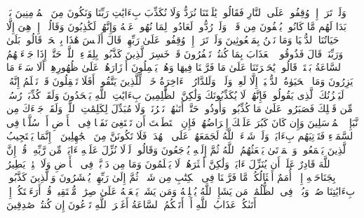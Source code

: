 \stopbuffer%
\startbuffer[\q:6:27]
وَلَوۡ تَرَىٰۤ إِذۡ وُقِفُوا۟ عَلَى ٱلنَّارِ فَقَالُوا۟ یَٰلَیۡتَنَا نُرَدُّ وَلَا نُكَذِّبَ بِءَایَٰتِ رَبِّنَا وَنَكُونَ مِنَ ٱلۡمُؤۡمِنِینَ%
\stopbuffer%
\startbuffer[\q:6:28]
بَلۡ بَدَا لَهُم مَّا كَانُوا۟ یُخۡفُونَ مِن قَبۡلُۖ وَلَوۡ رُدُّوا۟ لَعَادُوا۟ لِمَا نُهُوا۟ عَنۡهُ وَإِنَّهُمۡ لَكَٰذِبُونَ%
\stopbuffer%
\startbuffer[\q:6:29]
وَقَالُوۤا۟ إِنۡ هِیَ إِلَّا حَیَاتُنَا ٱلدُّنۡیَا وَمَا نَحۡنُ بِمَبۡعُوثِینَ%
\stopbuffer%
\startbuffer[\q:6:30]
وَلَوۡ تَرَىٰۤ إِذۡ وُقِفُوا۟ عَلَىٰ رَبِّهِمۡۚ قَالَ أَلَیۡسَ هَٰذَا بِٱلۡحَقِّۚ قَالُوا۟ بَلَىٰ وَرَبِّنَاۚ قَالَ فَذُوقُوا۟ ٱلۡعَذَابَ بِمَا كُنتُمۡ تَكۡفُرُونَ%
\stopbuffer%
\startbuffer[\q:6:31]
قَدۡ خَسِرَ ٱلَّذِینَ كَذَّبُوا۟ بِلِقَاۤءِ ٱللَّهِۖ حَتَّىٰۤ إِذَا جَاۤءَتۡهُمُ ٱلسَّاعَةُ بَغۡتَةࣰ قَالُوا۟ یَٰحَسۡرَتَنَا عَلَىٰ مَا فَرَّطۡنَا فِیهَا وَهُمۡ یَحۡمِلُونَ أَوۡزَارَهُمۡ عَلَىٰ ظُهُورِهِمۡۚ أَلَا سَاۤءَ مَا یَزِرُونَ%
\stopbuffer%
\startbuffer[\q:6:32]
وَمَا ٱلۡحَیَوٰةُ ٱلدُّنۡیَاۤ إِلَّا لَعِبࣱ وَلَهۡوࣱۖ وَلَلدَّارُ ٱلۡءَاخِرَةُ خَیۡرࣱ لِّلَّذِینَ یَتَّقُونَۚ أَفَلَا تَعۡقِلُونَ%
\stopbuffer%
\startbuffer[\q:6:33]
قَدۡ نَعۡلَمُ إِنَّهُۥ لَیَحۡزُنُكَ ٱلَّذِی یَقُولُونَۖ فَإِنَّهُمۡ لَا یُكَذِّبُونَكَ وَلَٰكِنَّ ٱلظَّٰلِمِینَ بِءَایَٰتِ ٱللَّهِ یَجۡحَدُونَ%
\stopbuffer%
\startbuffer[\q:6:34]
وَلَقَدۡ كُذِّبَتۡ رُسُلࣱ مِّن قَبۡلِكَ فَصَبَرُوا۟ عَلَىٰ مَا كُذِّبُوا۟ وَأُوذُوا۟ حَتَّىٰۤ أَتَىٰهُمۡ نَصۡرُنَاۚ وَلَا مُبَدِّلَ لِكَلِمَٰتِ ٱللَّهِۚ وَلَقَدۡ جَاۤءَكَ مِن نَّبَإِی۟ ٱلۡمُرۡسَلِینَ%
\stopbuffer%
\startbuffer[\q:6:35]
وَإِن كَانَ كَبُرَ عَلَیۡكَ إِعۡرَاضُهُمۡ فَإِنِ ٱسۡتَطَعۡتَ أَن تَبۡتَغِیَ نَفَقࣰا فِی ٱلۡأَرۡضِ أَوۡ سُلَّمࣰا فِی ٱلسَّمَاۤءِ فَتَأۡتِیَهُم بِءَایَةࣲۚ وَلَوۡ شَاۤءَ ٱللَّهُ لَجَمَعَهُمۡ عَلَى ٱلۡهُدَىٰۚ فَلَا تَكُونَنَّ مِنَ ٱلۡجَٰهِلِینَ%
\stopbuffer%
\startbuffer[\q:6:36]
۞ إِنَّمَا یَسۡتَجِیبُ ٱلَّذِینَ یَسۡمَعُونَۘ وَٱلۡمَوۡتَىٰ یَبۡعَثُهُمُ ٱللَّهُ ثُمَّ إِلَیۡهِ یُرۡجَعُونَ%
\stopbuffer%
\startbuffer[\q:6:37]
وَقَالُوا۟ لَوۡلَا نُزِّلَ عَلَیۡهِ ءَایَةࣱ مِّن رَّبِّهِۦۚ قُلۡ إِنَّ ٱللَّهَ قَادِرٌ عَلَىٰۤ أَن یُنَزِّلَ ءَایَةࣰ وَلَٰكِنَّ أَكۡثَرَهُمۡ لَا یَعۡلَمُونَ%
\stopbuffer%
\startbuffer[\q:6:38]
وَمَا مِن دَاۤبَّةࣲ فِی ٱلۡأَرۡضِ وَلَا طَٰۤئِرࣲ یَطِیرُ بِجَنَاحَیۡهِ إِلَّاۤ أُمَمٌ أَمۡثَالُكُمۚ مَّا فَرَّطۡنَا فِی ٱلۡكِتَٰبِ مِن شَیۡءࣲۚ ثُمَّ إِلَىٰ رَبِّهِمۡ یُحۡشَرُونَ%
\stopbuffer%
\startbuffer[\q:6:39]
وَٱلَّذِینَ كَذَّبُوا۟ بِءَایَٰتِنَا صُمࣱّ وَبُكۡمࣱ فِی ٱلظُّلُمَٰتِۗ مَن یَشَإِ ٱللَّهُ یُضۡلِلۡهُ وَمَن یَشَأۡ یَجۡعَلۡهُ عَلَىٰ صِرَٰطࣲ مُّسۡتَقِیمࣲ%
\stopbuffer%
\startbuffer[\q:6:40]
قُلۡ أَرَءَیۡتَكُمۡ إِنۡ أَتَىٰكُمۡ عَذَابُ ٱللَّهِ أَوۡ أَتَتۡكُمُ ٱلسَّاعَةُ أَغَیۡرَ ٱللَّهِ تَدۡعُونَ إِن كُنتُمۡ صَٰدِقِینَ%
